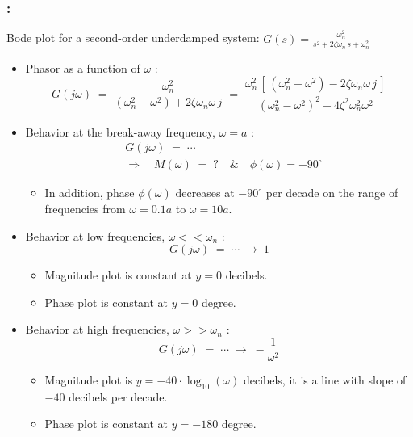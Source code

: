 \documentclass[ 10pt, xcolor = dvipsnames]{beamer}
\begin{document}
\begin{frame}[allowframebreaks]
\frametitle{\insertsection: \insertsubsection}

Bode plot for a second-order underdamped system: $\displaystyle G(s) = \frac{\omega_n^2}{s^2 + 2 \zeta \omega_n \, s + \omega_n^2}$
\begin{itemize}
\item Phasor as a function of $\omega$ : 
\[
G(j\omega) \; = \; 
\frac{\omega_n^2}{(\omega_n^2 -\omega^2) + 2 \zeta \omega_n \omega \, j} \; = \; 
\frac{\omega_n^2 \, [ \, (\omega_n^2 -\omega^2) - 2 \zeta \omega_n \omega \, j \, ]  }{(\omega_n^2 -\omega^2)^2 + 4 \zeta^2 \omega_n^2 \omega^2}
\]
\item Behavior at the break-away frequency, \ie $\omega = a$ :
\begin{align*}
& G(j\omega) \; = \;
\cdots \\[1ex]
& \Longrightarrow \quad
M(\omega) \; = \; ? \quad \& \quad \phi(\omega) = -90^{\circ}
\end{align*}
\halfcut
\begin{itemize}
\item In addition, phase $\phi(\omega)$ decreases at $-90^{\circ}$ per decade on the range of frequencies from $\omega = 0.1 a$ to $\omega = 10 a$. 
\end{itemize}

\framebreak

\item Behavior at low frequencies, \ie $\omega << \omega_n$ :
\[
G(j\omega) \; = \;
\cdots
\; \longrightarrow \; 1
\]
\fullcut
\begin{itemize}
\item Magnitude plot is constant at $y = 0$ decibels. 
\item Phase plot is constant at $y = 0$ degree. 
\end{itemize}
\halfskip
\item Behavior at high frequencies, \ie $\omega >> \omega_n$ :
\[
G(j\omega) \; = \;
\cdots
\; \longrightarrow \; -\frac{1}{\omega^2}
\]
\fullcut
\begin{itemize}
\item Magnitude plot is $y = -40 \cdot \log_{10}(\omega)$ decibels, \ie it is a line with slope of $-40$ decibels per decade. 
\item Phase plot is constant at $y = -180$ degree. 
\end{itemize}

\end{itemize}

\end{frame}
\end{document}
